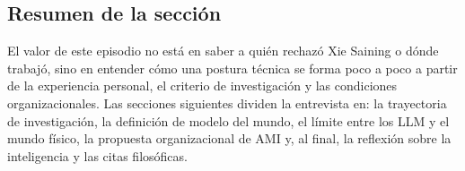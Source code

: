 \subsection{Resumen de la sección}

El valor de este episodio no está en saber a quién rechazó Xie Saining o dónde trabajó, sino en entender cómo una postura técnica se forma poco a poco a partir de la experiencia personal, el criterio de investigación y las condiciones organizacionales. Las secciones siguientes dividen la entrevista en: la trayectoria de investigación, la definición de modelo del mundo, el límite entre los LLM y el mundo físico, la propuesta organizacional de AMI y, al final, la reflexión sobre la inteligencia y las citas filosóficas.

